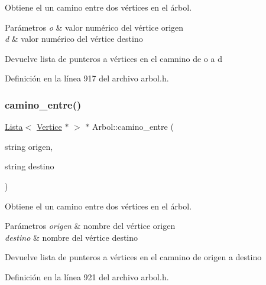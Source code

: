 Obtiene el un camino entre dos vértices en el árbol. 


\begin{DoxyParams}{Parámetros}
{\em o} & valor numérico del vértice origen \\
\hline
{\em d} & valor numérico del vértice destino \\
\hline
\end{DoxyParams}
\begin{DoxyReturn}{Devuelve}
lista de punteros a vértices en el camnino de o a d 
\end{DoxyReturn}


Definición en la línea 917 del archivo arbol.\+h.

\mbox{\label{classArbol_aef0f680828ac573af495b98d2eb09c12}} 
\subsubsection{\texorpdfstring{camino\+\_\+entre()}{camino\_entre()}\hspace{0.1cm}{\footnotesize\ttfamily [2/2]}}
{\footnotesize\ttfamily \hyperlink{classLista}{Lista}$<$ \hyperlink{classVertice}{Vertice} $\ast$ $>$ $\ast$ Arbol\+::camino\+\_\+entre (\begin{DoxyParamCaption}\item[{string}]{origen,  }\item[{string}]{destino }\end{DoxyParamCaption})}



Obtiene el un camino entre dos vértices en el árbol. 


\begin{DoxyParams}{Parámetros}
{\em origen} & nombre del vértice origen \\
\hline
{\em destino} & nombre del vértice destino \\
\hline
\end{DoxyParams}
\begin{DoxyReturn}{Devuelve}
lista de punteros a vértices en el camnino de origen a destino 
\end{DoxyReturn}


Definición en la línea 921 del archivo arbol.\+h.

\mbox{\label{classArbol_aba59969b2a10294fb79e583a8e9471c5}} 
